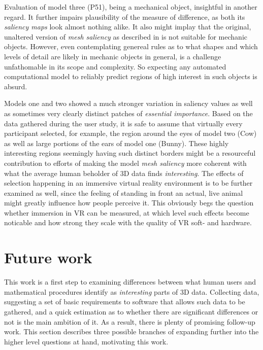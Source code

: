 Evaluation of model three (P51), being a mechanical object, insightful in another regard. It further impairs plausibility of the measure of difference, as both its \textit{saliency maps} look almost nothing alike. It also might implay that the original, unaltered version of \textit{mesh saliency} as described in \cite{lee2005mesh} is not suitable for mechanic objects. However, even contemplating genereal rules as to what shapes and which levels of detail are likely in mechanic objects in general, is a challenge unfathomable in its scope and complexity. So expecting any automated computational model to reliably predict regions of high interest in such objects is absurd.

Models one and two showed a much stronger variation in saliency values as well as sometimes very clearly distinct patches of \textit{essential importance}. Based on the data gathered during the user study, it is safe to assume that virtually every participant selected, for example, the region around the eyes of model two (Cow) as well as large portions of the ears of model one (Bunny). These highly interesting regions seemingly having such distinct borders might be a resourceful contribution to efforts of making the model \textit{mesh saliency} more coherent with what the average human beholder of 3D data finds \textit{interesting}. The effects of selection happening in an immersive virtual reality environment is to be further examined as well, since the feeling of standing in front an actual, live animal might greatly influence how people perceive it. This obviously begs the question whether immersion in VR can be measured, at which level such effects become noticable and how strong they scale with the quality of VR soft- and hardware.

\section{Future work}
\label{future_work}

This work is a first step to examining differences between what human users and mathematical procedures identify as \textit{interesting} parts of 3D data. Collecting data, suggesting a set of basic requirements to software that allows such data to be gathered, and a quick estimation as to whether there are significant differences or not is the main ambition of it. As a result, there is plenty of promising follow-up work. This section describes three possible branches of expanding further into the higher level questions at hand, motivating this work.

